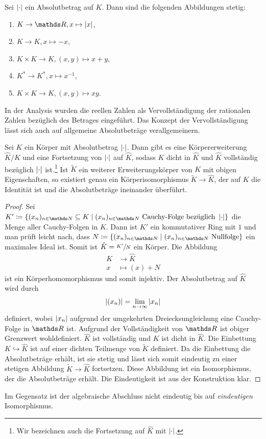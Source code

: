 \begin{satz}
Sei $\left\vert\cdot\right\vert$ ein Absolutbetrag auf $K$. Dann sind die folgenden Abbildungen stetig:
\begin{enumerate}[label=\roman*)]
\item $K\to \R, x \mapsto \abs{x}$,
\item $K\to K, x\mapsto -x$,
\item $K \times K \to K, (x,y)\mapsto x+y$,
\item $K^\ast \to K^\ast, x \mapsto x^{-1}$,
\item $K \times K \to K, (x,y)\mapsto xy$.
\end{enumerate}
\end{satz}

In der Analysis wurden die reellen Zahlen als Vervollständigung der rationalen Zahlen bezüglich des Betrages eingeführt.
Das Konzept der Vervollständigung lässt sich auch auf allgemeine Absolutbeträge verallgemeinern.

\begin{satz}
Sei $K$ ein Körper mit Absolutbetrag $\left\vert\cdot\right\vert$.
Dann gibt es eine Körpererweiterung $\hat{K}/K$ und eine Fortsetzung von $\left\vert\cdot\right\vert$ auf $\hat{K}$, sodass $K$ dicht in $\hat{K}$ und $\hat{K}$ vollständig bezüglich $\left\vert\cdot\right\vert$ ist.\footnote{Wir bezeichnen auch die Fortsetzung auf $\hat{K}$ mit $\left\vert\cdot\right\vert$.}
Ist $\tilde{K}$ ein weiterer Erweiterungskörper von $K$ mit obigen Eigenschaften,
so existiert genau ein Körperisomorphismus $\tilde{K}\to \hat{K}$, der auf $K$ die Identität ist
und die Absolutbeträge ineinander überführt.
\begin{proof}
Sei $K'\coloneqq\{(x_n)_{n\in \N}\subseteq K \mid (x_n)_{n\in \N} \text{ Cauchy-Folge bezüglich } \abs{\cdot}\}$ die Menge aller Cauchy-Folgen in $K$.
Dann ist $K'$ ein kommutativer Ring mit $1$ und man prüft leicht nach, dass $N\coloneqq\{(x_n)_{n\in \N}\mid (x_n)_{n\in \N} \text{ Nullfolge}\}$
ein maximales Ideal ist.
Somit ist $\hat{K}=\sfrac{K'}{N}$ ein Körper. Die Abbildung
\begin{align*}
K &\to \hat{K}\\
x &\mapsto (x)+N
\end{align*}
ist ein Körperhomomorphismus und somit injektiv.
Der Absolutbetrag auf $\hat{K}$ wird durch
\begin{align*}
\left\vert(x_n)\right\vert=\lim_{n\to \infty} \left\vert x_n\right\vert
\end{align*}
definiert, wobei $\left\vert x_n\right\vert$ aufgrund der umgekehrten
Dreiecksungleichung eine Cauchy-Folge in $\R$ ist.
Aufgrund der Vollständigkeit von $\R$ ist obiger Grenzwert wohldefiniert.
$\hat{K}$ ist vollständig und $K$ ist dicht in $\hat{K}$.
Die Einbettung $K \hookrightarrow \hat{K}$ ist auf einer dichten Teilmenge von $\tilde{K}$ definiert.
Da die Einbettung die Absolutbeträge erhält, ist sie stetig und lässt sich somit eindeutig zu einer stetigen Abbildung $\tilde{K}\to \hat{K}$ fortsetzen.
Diese Abbildung ist ein Isomorphismus, der die Absolutbeträge erhält.
Die Eindeutigkeit ist aus der Konstruktion klar.
\end{proof}
\end{satz}

\begin{bem}
Im Gegensatz ist der algebraische Abschluss nicht eindeutig bis auf \emph{eindeutigen} Isomorphismus.
\end{bem}